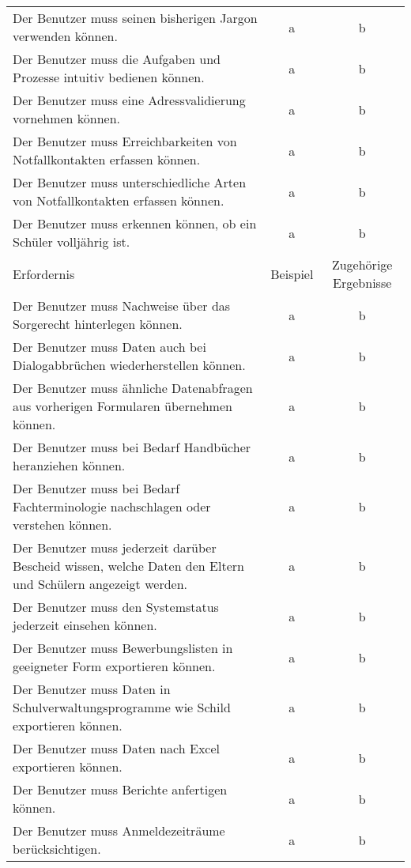 \begin{landscape}
\begin{longtable}{p{15cm}cc}
            Der Benutzer muss seinen bisherigen Jargon verwenden können. & a & b \\
            Der Benutzer muss die Aufgaben und Prozesse intuitiv bedienen können. & a & b \\
            Der Benutzer muss eine Adressvalidierung vornehmen können. & a & b \\
            Der Benutzer muss Erreichbarkeiten von Notfallkontakten erfassen können. & a & b \\
            Der Benutzer muss unterschiedliche Arten von Notfallkontakten erfassen können. & a & b \\
            Der Benutzer muss erkennen können, ob ein Schüler volljährig ist. & a & b \\
        \endfirsthead
        \toprule
        Erfordernis & Beispiel & Zugehörige Ergebnisse \\
        \midrule
        \endhead
        \bottomrule
        \endfoot
            Der Benutzer muss Nachweise über das Sorgerecht hinterlegen können. & a & b \\
            Der Benutzer muss Daten auch bei Dialogabbrüchen wiederherstellen können. & a & b \\
            Der Benutzer muss ähnliche Datenabfragen aus vorherigen Formularen übernehmen können. & a & b \\
            Der Benutzer muss bei Bedarf Handbücher heranziehen können. & a & b \\
            Der Benutzer muss bei Bedarf Fachterminologie nachschlagen oder verstehen können. & a & b \\
            Der Benutzer muss jederzeit darüber Bescheid wissen, welche Daten den Eltern und Schülern angezeigt werden. & a & b \\
            Der Benutzer muss den Systemstatus jederzeit einsehen können. & a & b \\
            Der Benutzer muss Bewerbungslisten in geeigneter Form exportieren können. & a & b \\
            Der Benutzer muss Daten in Schulverwaltungsprogramme wie Schild exportieren können. & a & b \\
            Der Benutzer muss Daten nach Excel exportieren können. & a & b \\
            Der Benutzer muss Berichte anfertigen können. & a & b \\
            Der Benutzer muss Anmeldezeiträume berücksichtigen. & a & b \\

\end{longtable}
\end{landscape}
